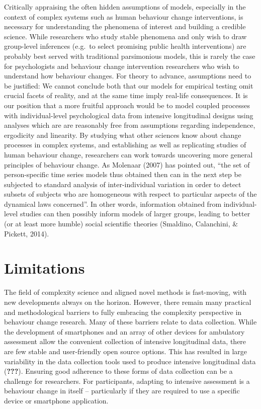\documentclass[
  british,
  man,floatsintext]{apa6}
\begin{document}
Critically appraising the often hidden assumptions of models, especially in the context of complex systems such as human behaviour change interventions, is necessary for understanding the phenomena of interest and building a credible science. While researchers who study stable phenomena and only wish to draw group-level inferences (e.g.~to select promising public health interventions) are probably best served with traditional parsimonious models, this is rarely the case for psychologists and behaviour change intervention researchers who wish to understand how behaviour changes. For theory to advance, assumptions need to be justified: We cannot conclude both that our models for empirical testing omit crucial facets of reality, and at the same time imply real-life consequences. It is our position that a more fruitful approach would be to model coupled processes with individual-level psychological data from intensive longitudinal designs using analyses which are are reasonably free from assumptions regarding independence, ergodicity and linearity. By studying what other sciences know about change processes in complex systems, and establishing as well as replicating studies of human behaviour change, researchers can work towards uncovering more general principles of behaviour change. As Molenaar (2007) has pointed out, \enquote{the set of person-specific time series models thus obtained then can in the next step be subjected to standard analysis of inter-individual variation in order to detect subsets of subjects who are homogeneous with respect to particular aspects of the dynamical laws concerned}. In other words, information obtained from individual-level studies can then possibly inform models of larger groups, leading to better (or at least more humble) social scientific theories (Smaldino, Calanchini, \& Pickett, 2014).

\hypertarget{limitations}{%
\section{Limitations}\label{limitations}}

The field of complexity science and aligned novel methods is fast-moving, with new developments always on the horizon. However, there remain many practical and methodological barriers to fully embracing the complexity perspective in behaviour change research. Many of these barriers relate to data collection. While the development of smartphones and an array of other devices for ambulatory assessment allow the convenient collection of intensive longitudinal data, there are few stable and user-friendly open source options. This has resulted in large variability in the data collection tools used to produce intensive longitudinal data ({\textbf{???}}). Ensuring good adherence to these forms of data collection can be a challenge for researchers. For participants, adapting to intensive assessment is a behaviour change in itself -- particularly if they are required to use a specific device or smartphone application.
\end{document}
